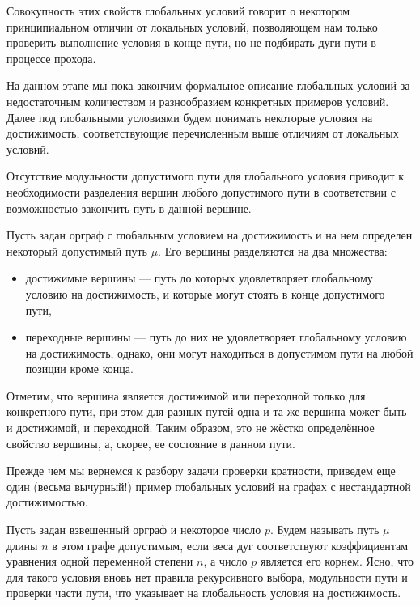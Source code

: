 Совокупность этих свойств глобальных условий говорит о некотором принципиальном отличии от локальных условий, позволяющем нам только проверить выполнение условия в конце пути, но не подбирать дуги пути в процессе прохода. 

На данном этапе мы пока закончим формальное описание глобальных условий за недостаточным количеством и разнообразием конкретных примеров условий. Далее под глобальными условиями будем понимать некоторые условия на достижимость, соответствующие перечисленным выше отличиям от локальных условий.   

Отсутствие модульности допустимого пути для глобального условия приводит к необходимости разделения вершин любого допустимого пути в соответствии с возможностью закончить путь в данной вершине. 

\newpage

\begin{definition}
	Пусть задан орграф с глобальным условием на достижимость и на нем определен некоторый допустимый путь $\mu$. Его вершины разделяются на два множества:
	\begin{itemize}
		\item достижимые вершины --- путь до которых удовлетворяет глобальному условию на достижимость, и которые могут стоять в конце допустимого пути,
		\item переходные вершины --- путь до них не удовлетворяет глобальному условию на достижимость, однако, они могут находиться в допустимом пути на любой позиции кроме конца.
	\end{itemize}
\end{definition}

Отметим, что вершина является достижимой или переходной только для конкретного пути, при этом для разных путей одна и та же вершина может быть и достижимой, и переходной. Таким образом, это не жёстко определённое свойство вершины, а, скорее, ее состояние в данном пути. 

Прежде чем мы вернемся к разбору задачи проверки кратности, приведем еще один (весьма вычурный!) пример глобальных условий на графах с нестандартной достижимостью.

Пусть задан взвешенный орграф и некоторое число $p$. Будем называть путь $\mu$ длины $n$ в этом графе допустимым, если веса дуг соответствуют коэффициентам уравнения одной переменной степени $n$, а число $p$ является его корнем. Ясно, что для такого условия вновь нет правила рекурсивного выбора, модульности пути и проверки части пути, что указывает на глобальность условия на достижимость. 


